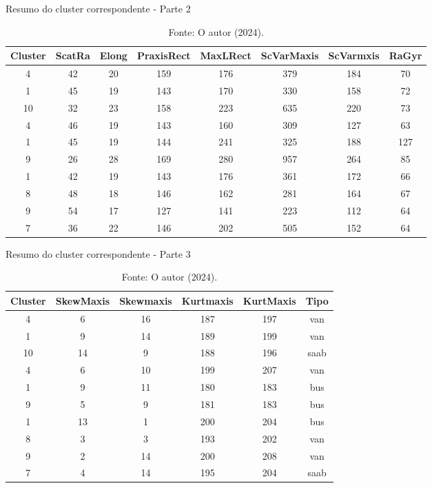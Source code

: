 \begin{table}[H]
\centering
\caption{Resumo do cluster correspondente - Parte 2}
\begin{tabular}{|c|c|c|c|c|c|c|c|}
\hline
Cluster & ScatRa & Elong & PraxisRect & MaxLRect & ScVarMaxis & ScVarmxis & RaGyr \\ \hline
4  & 42 & 20 & 159 & 176 & 379 & 184 & 70 \\ \hline
1  & 45 & 19 & 143 & 170 & 330 & 158 & 72 \\ \hline
10 & 32 & 23 & 158 & 223 & 635 & 220 & 73 \\ \hline
4  & 46 & 19 & 143 & 160 & 309 & 127 & 63 \\ \hline
1  & 45 & 19 & 144 & 241 & 325 & 188 & 127 \\ \hline
9  & 26 & 28 & 169 & 280 & 957 & 264 & 85 \\ \hline
1  & 42 & 19 & 143 & 176 & 361 & 172 & 66 \\ \hline
8  & 48 & 18 & 146 & 162 & 281 & 164 & 67 \\ \hline
9  & 54 & 17 & 127 & 141 & 223 & 112 & 64 \\ \hline
7  & 36 & 22 & 146 & 202 & 505 & 152 & 64 \\ \hline
\end{tabular}
\caption*{Fonte: O autor (2024).}
\end{table}

\begin{table}[H]
\centering
\caption{Resumo do cluster correspondente - Parte 3}
\begin{tabular}{|c|c|c|c|c|c|}
\hline
Cluster & SkewMaxis & Skewmaxis & Kurtmaxis & KurtMaxis & Tipo \\ \hline
4  & 6  & 16 & 187 & 197 & van  \\ \hline
1  & 9  & 14 & 189 & 199 & van  \\ \hline
10 & 14 & 9  & 188 & 196 & saab \\ \hline
4  & 6  & 10 & 199 & 207 & van  \\ \hline
1  & 9  & 11 & 180 & 183 & bus  \\ \hline
9  & 5  & 9  & 181 & 183 & bus  \\ \hline
1  & 13 & 1  & 200 & 204 & bus  \\ \hline
8  & 3  & 3  & 193 & 202 & van  \\ \hline
9  & 2  & 14 & 200 & 208 & van  \\ \hline
7  & 4  & 14 & 195 & 204 & saab \\ \hline
\end{tabular}
\caption*{Fonte: O autor (2024).}
\end{table}



